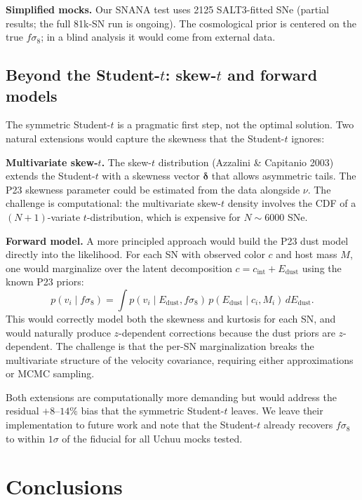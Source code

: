 \documentclass[fleqn,usenatbib]{mnras}
\begin{document}
\textbf{Simplified mocks.} Our SNANA test uses 2125 SALT3-fitted
SNe (partial results; the full 81k-SN run is ongoing). The
cosmological prior is centered on the true $f\sigma_8$; in a
blind analysis it would come from external data.

\subsection{Beyond the Student-$t$: skew-$t$ and forward models}
\label{sec:beyond}

The symmetric Student-$t$ is a pragmatic first step, not the
optimal solution. Two natural extensions would capture the
skewness that the Student-$t$ ignores:

\textbf{Multivariate skew-$t$.} The skew-$t$ distribution
(Azzalini \& Capitanio 2003) extends the Student-$t$ with a
skewness vector $\bm{\delta}$ that allows asymmetric tails.
The P23 skewness parameter could be estimated from the data
alongside $\nu$. The challenge is computational: the
multivariate skew-$t$ density involves the CDF of a
$(N{+}1)$-variate $t$-distribution, which is expensive for
$N \sim 6000$ SNe.

\textbf{Forward model.} A more principled approach would
build the P23 dust model directly into the likelihood. For
each SN with observed color $c$ and host mass $M$, one would
marginalize over the latent decomposition $c = c_\mathrm{int}
+ E_\mathrm{dust}$ using the known P23 priors:
\begin{equation}
p(v_i \mid f\sigma_8) = \int p(v_i \mid E_\mathrm{dust},
f\sigma_8)\,p(E_\mathrm{dust} \mid c_i, M_i)\,
dE_\mathrm{dust}.
\label{eq:forward}
\end{equation}
This would correctly model both the skewness and kurtosis
for each SN, and would naturally produce $z$-dependent
corrections because the dust priors are $z$-dependent. The
challenge is that the per-SN marginalization breaks the
multivariate structure of the velocity covariance, requiring
either approximations or MCMC sampling.

Both extensions are computationally more demanding but would
address the residual $+8$--$14\%$ bias that the symmetric
Student-$t$ leaves. We leave their implementation to future
work and note that the Student-$t$ already recovers $f\sigma_8$
to within $1\sigma$ of the fiducial for all Uchuu mocks tested.

\section{Conclusions}
\label{sec:conclusions}
\end{document}
